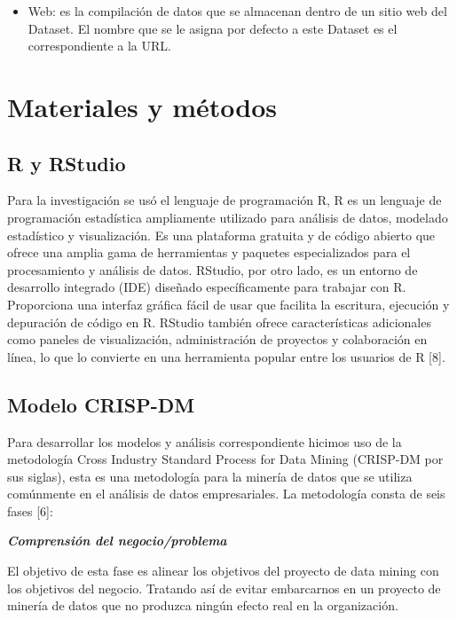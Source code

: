 \documentclass[
]{article}
\providecommand{\tightlist}{%
  \setlength{\itemsep}{0pt}\setlength{\parskip}{0pt}}
\begin{document}
\begin{itemize}
\tightlist
\item
  Web: es la compilación de datos que se almacenan dentro de un sitio
  web del Dataset. El nombre que se le asigna por defecto a este Dataset
  es el correspondiente a la URL.
\end{itemize}

\hypertarget{materiales-y-muxe9todos}{%
\section{Materiales y métodos}\label{materiales-y-muxe9todos}}

\hypertarget{r-y-rstudio}{%
\subsection{R y RStudio}\label{r-y-rstudio}}

Para la investigación se usó el lenguaje de programación R, R es un
lenguaje de programación estadística ampliamente utilizado para análisis
de datos, modelado estadístico y visualización. Es una plataforma
gratuita y de código abierto que ofrece una amplia gama de herramientas
y paquetes especializados para el procesamiento y análisis de datos.
RStudio, por otro lado, es un entorno de desarrollo integrado (IDE)
diseñado específicamente para trabajar con R. Proporciona una interfaz
gráfica fácil de usar que facilita la escritura, ejecución y depuración
de código en R. RStudio también ofrece características adicionales como
paneles de visualización, administración de proyectos y colaboración en
línea, lo que lo convierte en una herramienta popular entre los usuarios
de R {[}8{]}.

\hypertarget{modelo-crisp-dm}{%
\subsection{Modelo CRISP-DM}\label{modelo-crisp-dm}}

Para desarrollar los modelos y análisis correspondiente hicimos uso de
la metodología Cross Industry Standard Process for Data Mining (CRISP-DM
por sus siglas), esta es una metodología para la minería de datos que se
utiliza comúnmente en el análisis de datos empresariales. La metodología
consta de seis fases {[}6{]}:

\textbf{\emph{Comprensión del negocio/problema}}

El objetivo de esta fase es alinear los objetivos del proyecto de data
mining con los objetivos del negocio. Tratando así de evitar embarcarnos
en un proyecto de minería de datos que no produzca ningún efecto real en
la organización.
\end{document}
